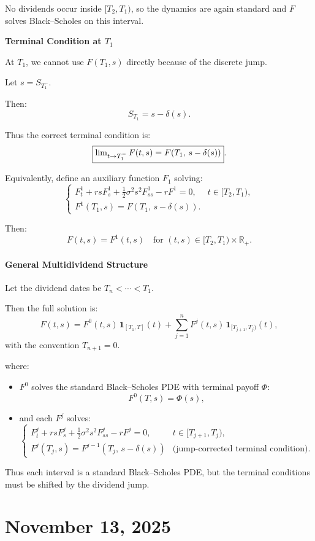 \documentclass[12pt,a4paper]{article}
\theoremstyle{definition}
\newcommand{\R}{\mathbb{R}}
\begin{document}
No dividends occur inside $[T_2, T_1)$, so the dynamics are again standard and $F$ solves Black--Scholes on this interval.

\textbf{Terminal Condition at $T_1$}

At $T_1$, we cannot use $F(T_1, s)$ directly because of the discrete jump.

Let $s = S_{T_1^-}$.

Then:
\[
S_{T_1} = s - \delta(s).
\]

Thus the correct terminal condition is:
\[
\fbox{$\lim_{t \to T_1^-} F(t, s) = F(T_1, \, s - \delta(s))$}.
\]

Equivalently, define an auxiliary function $F_1$ solving:
\[
\begin{cases}
F_t^1 + r s F_s^1 + \frac{1}{2} \sigma^2 s^2 F_{ss}^1 - r F^1 = 0, & t \in [T_2, T_1), \\
F^1(T_1, s) = F(T_1, \, s - \delta(s)).
\end{cases}
\]

Then:
\[
F(t, s) = F^1(t, s) \quad \text{for } (t, s) \in [T_2, T_1) \times \R_+.
\]

\paragraph{General Multidividend Structure}

Let the dividend dates be $T_n < \cdots < T_1$.

Then the full solution is:
\[
F(t, s) = F^0(t, s) \, \mathbf{1}_{[T_1, T]}(t) + \sum_{j=1}^n F^j(t, s) \, \mathbf{1}_{[T_{j+1}, T_j)}(t),
\]
with the convention $T_{n+1} = 0$.

where:
\begin{itemize}
\item $F^0$ solves the standard Black--Scholes PDE with terminal payoff $\Phi$:
\[
F^0(T, s) = \Phi(s),
\]
\item and each $F^j$ solves:
\[
\begin{cases}
F_t^j + r s F_s^j + \frac{1}{2} \sigma^2 s^2 F_{ss}^j - r F^j = 0, & t \in [T_{j+1}, T_j), \\
F^j(T_j, s) = F^{j-1}(T_j, \, s - \delta(s)) & \text{(jump-corrected terminal condition)}.
\end{cases}
\]
\end{itemize}

Thus each interval is a standard Black--Scholes PDE, but the terminal conditions must be shifted by the dividend jump.

\newpage
\section{November 13, 2025}
\end{document}
